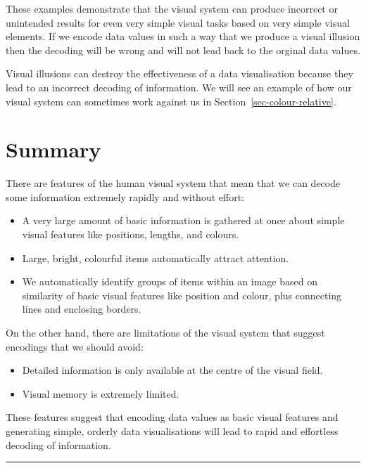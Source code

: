 \documentclass[
  letterpaper,
  DIV=11,
  numbers=noendperiod]{scrreprt}
\begin{document}
These examples demonstrate that the visual system can produce incorrect
or unintended results for even very simple visual tasks based on very
simple visual elements. If we encode data values in such a way that we
produce a visual illusion then the decoding will be wrong and will not
lead back to the orginal data values.

Visual illusions can destroy the effectiveness of a data visualisation
because they lead to an incorrect decoding of information. We will see
an example of how our visual system can sometimes work against us in
Section~\ref{sec-colour-relative}.

\section{Summary}\label{summary-1}

There are features of the human visual system that mean that we can
decode some information extremely rapidly and without effort:

\begin{itemize}
\item
  A very large amount of basic information is gathered at once about
  simple visual features like positions, lengths, and colours.
\item
  Large, bright, colourful items automatically attract attention.
\item
  We automatically identify groups of items within an image based on
  similarity of basic visual features like position and colour, plus
  connecting lines and enclosing borders.
\end{itemize}

On the other hand, there are limitations of the visual system that
suggest encodings that we should avoid:

\begin{itemize}
\item
  Detailed information is only available at the centre of the visual
  field.
\item
  Visual memory is extremely limited.
\end{itemize}

These features suggest that encoding data values as basic visual
features and generating simple, orderly data visualisations will lead to
rapid and effortless decoding of information.

\begin{center}\rule{0.5\linewidth}{0.5pt}\end{center}
\end{document}
